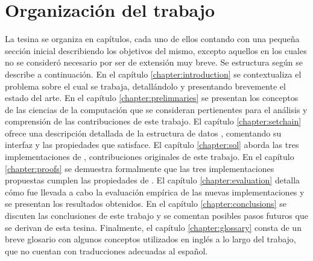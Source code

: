   \section{Organización del trabajo}
  La tesina se organiza en capítulos, cada uno de ellos contando con una pequeña sección inicial
  describiendo los objetivos del mismo, excepto aquellos en los cuales no se consideró necesario por
  ser de extensión muy breve.
  Se estructura según se describe a continuación.
  En el capítulo \ref{chapter:introduction} se
  contextualiza el problema sobre el cual se trabaja, detallándolo y presentando brevemente
  el estado del arte.
  En el capítulo \ref{chapter:prelimnaries} se presentan los conceptos de las ciencias de la computación que se
  consideran pertienentes para el análisis y comprensión de las contribuciones de este trabajo.
  El capítulo \ref{chapter:setchain} ofrece una descripción detallada de la estructura de datos \setchain,
  comentando su interfaz y las propiedades que satisface.
  El capítulo \ref{chapter:sol} aborda las tres implementaciones de \setchain, contribuciones originales
  de este trabajo.
  En el capítulo \ref{chapter:proofs} se demuestra formalmente que las tres implementaciones propuestas
  cumplen las propiedades de \setchain.
  El capítulo \ref{chapter:evaluation} detalla cómo fue llevada a cabo la evaluación empírica de las
  nuevas implementaciones y se presentan los resultados obtenidos.
  En el capítulo \ref{chapter:conclusions} se discuten las conclusiones de este trabajo y 
  se comentan posibles pasos futuros que se derivan de esta tesina.
  Finalmente, el capítulo \ref{chapter:glossary} consta de un breve glosario con algunos conceptos
  utilizados en inglés a lo largo del trabajo, que no cuentan con traducciones adecuadas al español.

